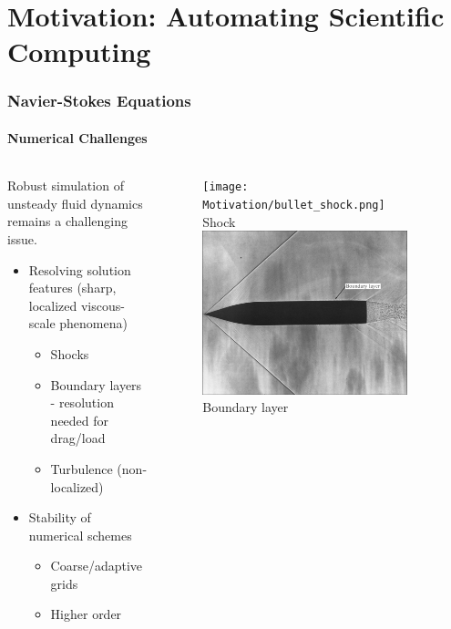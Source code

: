 \documentclass[18pt,xcolor=table]{beamer}
\begin{document}
\section{Motivation: Automating Scientific Computing}
\begin{frame}[t]
\frametitle{Navier-Stokes Equations}
\framesubtitle{Numerical Challenges}
\begin{columns}[c]
\begin{column}{.6\textwidth}
Robust simulation of unsteady fluid dynamics remains a challenging issue.
\vspace{2ex}

\begin{itemize}
\item{} Resolving solution features (sharp, localized viscous-scale phenomena)
\begin{itemize}
\item{} Shocks
\item{} Boundary layers - resolution needed for drag/load
\item{} Turbulence (non-localized)
\end{itemize}
\item{} Stability of numerical schemes
\begin{itemize}
\item{} Coarse/adaptive grids
\item{} Higher order
\end{itemize}
\end{itemize}
\end{column}
\begin{column}{.4\textwidth}
\vspace{-3ex}
\begin{figure}
\centering
\texttt{[image: Motivation/bullet\_shock.png]}\\
Shock\\\vspace{1ex}
\includegraphics[width=0.9\textwidth]{Motivation/boundary_layer.png}\\
Boundary layer
\end{figure}
\end{column}
\end{columns}
\end{frame}  
\end{document}
